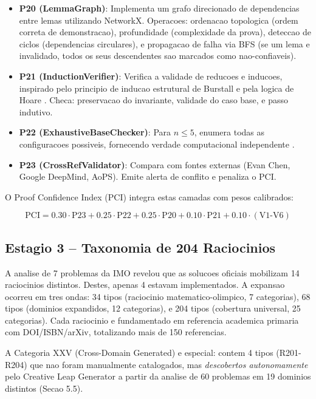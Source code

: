 \documentclass[5p]{elsarticle}
\begin{document}
\begin{itemize}
 \item \textbf{P20 (LemmaGraph)}: Implementa um grafo direcionado de dependencias
 entre lemas utilizando NetworkX. Operacoes: ordenacao topologica (ordem
 correta de demonstracao), profundidade (complexidade da prova), deteccao
 de ciclos (dependencias circulares), e propagacao de falha via BFS (se um
 lema e invalidado, todos os seus descendentes sao marcados como
 nao-confiaveis).
 \item \textbf{P21 (InductionVerifier)}: Verifica a validade de reducoes e
 inducoes, inspirado pelo principio de inducao estrutural de Burstall
 \cite{burstall1969} e pela logica de Hoare \cite{hoare1969}. Checa:
 preservacao do invariante, validade do caso base, e passo indutivo.
 \item \textbf{P22 (ExhaustiveBaseChecker)}: Para $n\leq 5$, enumera todas as
 configuracoes possiveis, fornecendo verdade computacional independente
 \cite{clarke1999}.
 \item \textbf{P23 (CrossRefValidator)}: Compara com fontes externas (Evan Chen,
 Google DeepMind, AoPS). Emite alerta de conflito e penaliza o PCI.
\end{itemize}

O Proof Confidence Index (PCI) integra estas camadas com pesos calibrados:

\begin{equation}\label{eq:pci}
 \text{PCI} = 0.30\cdot\text{P23} + 0.25\cdot\text{P22}
 + 0.25\cdot\text{P20} + 0.10\cdot\text{P21}
 + 0.10\cdot(\text{V1-V6})
\end{equation}

\subsection{Estagio 3 -- Taxonomia de 204 Raciocinios}

A analise de 7 problemas da IMO revelou que as solucoes oficiais mobilizam 14
raciocinios distintos. Destes, apenas 4 estavam implementados. A expansao
ocorreu em tres ondas: 34 tipos (raciocinio matematico-olimpico, 7 categorias),
68 tipos (dominios expandidos, 12 categorias), e 204 tipos (cobertura universal,
25 categorias). Cada raciocinio e fundamentado em referencia academica primaria
com DOI/ISBN/arXiv, totalizando mais de 150 referencias.

A Categoria XXV (Cross-Domain Generated) e especial: contem 4 tipos (R201-R204)
que nao foram manualmente catalogados, mas \textit{descobertos autonomamente}
pelo Creative Leap Generator a partir da analise de 60 problemas em 19 dominios
distintos (Secao 5.5).
\end{document}

